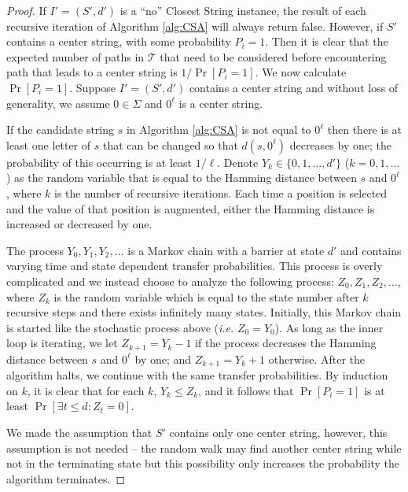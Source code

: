 \begin{proof} If $I' = (S', d')$ is a ``no'' {\sc Closest String} instance, the result of each recursive iteration of Algorithm \ref{alg:CSA} will always return false. However, if $S'$ contains a center string, with some probability $P_i = 1$.  Then it is clear that the expected number of paths in $\mathcal{T}$ that need to be considered before encountering  path that leads to a center string is $1/\Pr[P_i = 1]$.  We now calculate $\Pr[P_i = 1]$.  Suppose $I' = (S', d')$ contains a center string and without loss of generality, we assume $0 \in \Sigma$ and $0^{\ell}$ is a center string. 

If the candidate string $s$ in Algorithm \ref{alg:CSA} is not equal to $0^{\ell}$ then there is at least one letter of $s$ that can be changed so that $d(s, 0^{\ell})$ decreases by one; the probability of this occurring is at least $1/\ell$.  Denote $Y_k \in \{0, 1, \ldots, d'\}$ ($k = 0, 1, \ldots$) as the random variable that is equal to the Hamming distance between $s$ and $0^{\ell}$, where $k$ is the number of recursive iterations.  Each time a position is selected and the value of that position is augmented, either the Hamming distance is increased or decreased by one.

The process $Y_0, Y_1, Y_2, \ldots$ is a Markov chain with a barrier at state $d'$ and contains varying time and state dependent transfer probabilities. This process is overly complicated and we instead choose to analyze the following process: $Z_0, Z_1, Z_2, \ldots$,  where $Z_k$ is the random variable which is equal to the state number after $k$ recursive steps and there exists infinitely many states.  Initially, this Markov chain is started like the stochastic process above ({\em i.e.} $Z_0 = Y_0$).  As long as the inner loop is iterating, we let $Z_{k+1} = Y_k - 1$  if the process decreases the Hamming distance between $s$ and $0^{\ell}$ by one; and $Z_{k+1} = Y_k + 1$ otherwise.  After the algorithm halts, we continue with the same transfer probabilities. By induction on $k$, it is clear that for each $k$, $Y_k \leq Z_k$, and it follows that $\Pr[P_i = 1]$ is at least $\Pr[\exists t \leq d: Z_t = 0]$.    

We made the assumption that $S'$ contains only one center string, however, this assumption is not needed -- the random walk may find another center string while not in the terminating state but this possibility only increases the probability the algorithm terminates. 


\end{proof}
